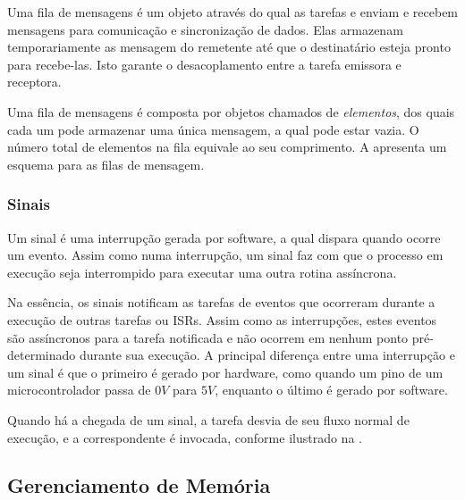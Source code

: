 Uma fila de mensagens é um objeto através do qual as tarefas e  enviam e recebem mensagens para comunicação e sincronização de dados. Elas armazenam temporariamente as mensagem do remetente até que o destinatário esteja pronto para recebe-las. Isto garante o desacoplamento entre a tarefa emissora e receptora.

Uma fila de mensagens é composta por objetos chamados de \emph{elementos}, dos quais cada um pode armazenar uma única mensagem, a qual pode estar vazia. O número total de elementos na fila equivale ao seu comprimento. A  apresenta um esquema para as filas de mensagem.


\subsubsection{Sinais}

Um sinal é uma interrupção gerada por software, a qual dispara quando ocorre um evento. Assim como numa interrupção, um sinal faz com que o processo em execução seja interrompido para executar uma outra rotina assíncrona.

Na essência, os sinais notificam as tarefas de eventos que ocorreram durante a execução de outras tarefas ou ISRs. Assim como as interrupções, estes eventos são assíncronos para a tarefa notificada e não ocorrem em nenhum ponto pré-determinado durante sua execução. A principal diferença entre uma interrupção e um sinal é que o primeiro é gerado por hardware, como quando um pino de um microcontrolador passa de $0V$ para $5V$, enquanto o último é gerado por software.

Quando há a chegada de um sinal, a tarefa desvia de seu fluxo normal de execução, e a  correspondente é invocada, conforme ilustrado na .


\subsection{Gerenciamento de Memória}

